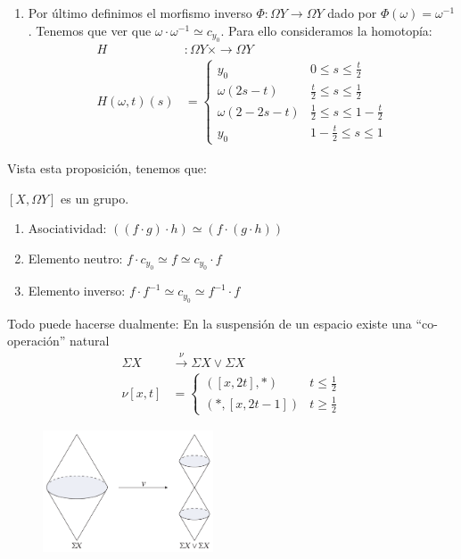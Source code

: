 \begin{demo}
\begin{enumerate}
\item Por último definimos el morfismo inverso $\varPhi : \Omega Y \longrightarrow \Omega Y $ dado por $\varPhi(\omega) = \omega^{-1}$. Tenemos que ver que $\omega \cdotp \omega^{-1} \simeq c_{y_0}$. Para ello consideramos la homotopía:
\begin{align*}
H &: \Omega Y \times \longrightarrow \Omega Y \\
H(\omega, t)(s) &= 
\begin{cases}
y_0 & 0 \leq s \leq \frac{t}{2} \\
\omega(2s - t) & \frac{t}{2} \leq s \leq \frac{1}{2} \\
\omega(2 - 2s - t) & \frac{1}{2} \leq s \leq 1 - \frac{t}{2} \\
y_0 & 1 - \frac{t}{2} \leq s \leq 1
\end{cases}
\end{align*}
\end{enumerate}
\end{demo}
Vista esta proposición, tenemos que:
\begin{teor}
$[X, \Omega Y]$ es un grupo.
\end{teor}
\begin{demo}
\begin{enumerate}
\item Asociatividad: $ \left((f \cdotp g) \cdotp h \right) \simeq \left(f \cdotp (g \cdotp h) \right)  $
\item Elemento neutro: $f \cdotp c_{y_0} \simeq f \simeq c_{y_0} \cdotp f$
\item Elemento inverso: $ f \cdotp f^{-1} \simeq c_{y_0} \simeq f^{-1} \cdotp f$
\end{enumerate}
\end{demo}
Todo puede hacerse dualmente: En la suspensión de un espacio existe una ``co-operación'' natural
\begin{align*}
\Sigma X &\stackrel{\nu}{\longrightarrow} \Sigma X \vee \Sigma X \\
\nu [x, t] &= 
\begin{cases}
([x, 2t], \ast ) & t \leq \frac{1}{2} \\
( \ast, [x, 2t -1]) & t \geq \frac{1}{2}
\end{cases}
\end{align*}
\begin{figure}[h]
\centering
\includegraphics[width=0.45\textwidth]{images/suspoperac.pdf}
\end{figure}


